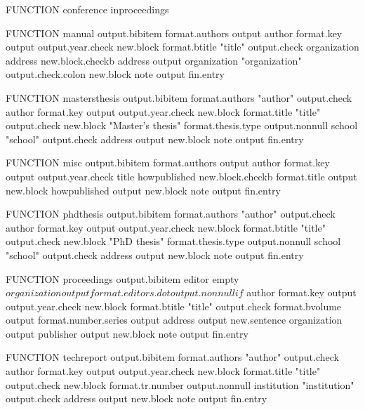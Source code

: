 FUNCTION {conference} { inproceedings }

FUNCTION {manual}
{ output.bibitem
  format.authors output
  author format.key output          %
  output.year.check                 %
  new.block
  format.btitle 
  "title" output.check
  organization address new.block.checkb
  address output
  organization "organization" output.check.colon
  new.block
  note output
  fin.entry
}

FUNCTION {mastersthesis}
{ output.bibitem
  format.authors 
  "author" output.check
  author format.key output          %
  output.year.check                 %
  new.block
  format.title 
  "title" output.check
  new.block
  "Master's thesis" format.thesis.type output.nonnull
  school "school" output.check
  address output
  new.block
  note output
  fin.entry
}

FUNCTION {misc}
{ output.bibitem
  format.authors output
  author format.key output            %
  output.year.check                   %
  title howpublished new.block.checkb
  format.title output
  new.block
  howpublished output
  new.block
  note output
  fin.entry
}

FUNCTION {phdthesis}
{ output.bibitem
  format.authors 
  "author" output.check
  author format.key output            %
  output.year.check                   %
  new.block
  format.btitle 
  "title" output.check
  new.block
  "PhD thesis" format.thesis.type output.nonnull
  school "school" output.check
  address output
  new.block
  note output
  fin.entry
}

FUNCTION {proceedings}
{ output.bibitem
  editor empty$
    { organization output }
    { format.editors.dot output.nonnull }
  if$
  author format.key output             %
  output.year.check                    %
  new.block
  format.btitle 
  "title" output.check
  format.bvolume output
  format.number.series output
  address output
  new.sentence
  organization output
  publisher output
  new.block
  note output
  fin.entry
}

FUNCTION {techreport}
{ output.bibitem
  format.authors 
  "author" output.check
  author format.key output             %
  output.year.check                    %
  new.block
  format.title 
  "title" output.check
  new.block
  format.tr.number output.nonnull
  institution 
  "institution" output.check
  address output
  new.block
  note output
  fin.entry
}

